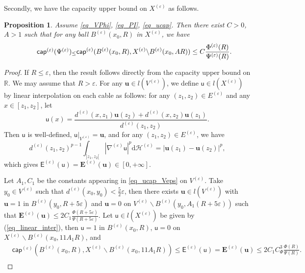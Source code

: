 \documentclass[11pt,a4paper]{article}
\numberwithin{equation}{section}
\theoremstyle{plain}
\newtheorem{proposition}[theorem]{Proposition}
\theoremstyle{definition}
\begin{document}
Secondly, we have the capacity upper bound on $X^{(\varepsilon)}$ as follows.

\begin{proposition}\label{prop_ucap_Xeps}
Assume \ref{eq_VPhi}, \ref{eq_PI}, \ref{eq_ucap}. Then there exist $C>0$, $A>1$ such that for any ball $B^{(\varepsilon)}(x_0,R)$ in $X^{(\varepsilon)}$, we have
\begin{equation*}\label{eq_ucap_Xeps}\tag*{$\mathsf{cap}^{(\varepsilon)}(\Psi^{(\varepsilon)})_\le$}
\mathsf{cap}^{(\varepsilon)}(B^{(\varepsilon)}(x_0,R),X^{(\varepsilon)}\backslash B^{(\varepsilon)}(x_0,AR))\le C \frac{\Phi^{(\varepsilon)}(R)}{\Psi^{(\varepsilon)}(R)}.
\end{equation*}
\end{proposition}

\begin{proof}
If $R\le\varepsilon$, then the result follows directly from the capacity upper bound on $\mathbb{R}$. We may assume that $R>\varepsilon$. For any $\mathbf{u}\in l(V^{(\varepsilon)})$, we define $\mathsf{u}\in l(X^{(\varepsilon)})$ by linear interpolation on each cable as follows: for any $(z_1,z_2)\in E^{(\varepsilon)}$ and any $x\in[z_1,z_2]$, let
\begin{equation}\label{eq_linear_inter}
\mathsf{u}(x)=\frac{d^{(\varepsilon)}(x,z_1)\mathbf{u}(z_2)+d^{(\varepsilon)}(x,z_2)\mathbf{u}(z_1)}{d^{(\varepsilon)}(z_1,z_2)}.
\end{equation}
Then $\mathsf{u}$ is well-defined, $\mathsf{u}|_{V^{(\varepsilon)}}=\mathbf{u}$, and for any $(z_1,z_2)\in E^{(\varepsilon)}$, we have
$$d^{(\varepsilon)}(z_1,z_2)^{p-1}\int_{]z_1,z_2[}|\nabla^{(\varepsilon)}\mathsf{u}|^p\mathrm{d}\mathcal{H}^{(\varepsilon)}=|\mathbf{u}(z_1)-\mathbf{u}(z_2)|^p,$$
which gives $\mathsf{E}^{(\varepsilon)}(\mathsf{u})=\mathbf{E}^{(\varepsilon)}(\mathbf{u})\in[0,+\infty]$.

Let $A_1,C_1$ be the constants appearing in \ref{eq_ucap_Veps} on $V^{(\varepsilon)}$. Take $y_0\in V^{(\varepsilon)}$ such that $d^{(\varepsilon)}(x_0,y_0)<\frac{5}{2}\varepsilon$, then there exists $\mathbf{u}\in l(V^{(\varepsilon)})$ with $\mathbf{u}=1$ in $B^{(\varepsilon)}(y_0,R+5\varepsilon)$ and $\mathbf{u}=0$ on $V^{(\varepsilon)}\backslash B^{(\varepsilon)}(y_0,A_1(R+5\varepsilon))$ such that $\mathbf{E}^{(\varepsilon)}(\mathbf{u})\le 2C_1 \frac{\Phi(R+5\varepsilon)}{\Psi(R+5\varepsilon)}$. Let $\mathsf{u}\in l(X^{(\varepsilon)})$ be given by (\ref{eq_linear_inter}), then $\mathsf{u}=1$ in $B^{(\varepsilon)}(x_0,R)$, $\mathsf{u}=0$ on $X^{(\varepsilon)}\backslash B^{(\varepsilon)}(x_0,11A_1R)$, and
\begin{align*}
&\mathsf{cap}^{(\varepsilon)}(B^{(\varepsilon)}(x_0,R),X^{(\varepsilon)}\backslash B^{(\varepsilon)}(x_0,11A_1R))\le\mathsf{E}^{(\varepsilon)}(\mathsf{u})=\mathbf{E}^{(\varepsilon)}(\mathbf{u})\le2C_1C_\Phi^3 \frac{\Phi(R)}{\Psi(R)}.\\
\end{align*}
\end{proof}
\end{document}
